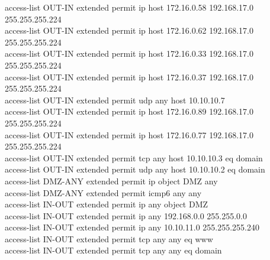 \documentclass[a4paper, 12pt]{article}
\begin{document}
{\hspace*{1cm}access-list OUT-IN extended permit ip host 172.16.0.58 192.168.17.0 255.255.255.224\\
\hspace*{1cm}access-list OUT-IN extended permit ip host 172.16.0.62 192.168.17.0 255.255.255.224\\
\hspace*{1cm}access-list OUT-IN extended permit ip host 172.16.0.33 192.168.17.0 255.255.255.224\\
\hspace*{1cm}access-list OUT-IN extended permit ip host 172.16.0.37 192.168.17.0 255.255.255.224\\
\hspace*{1cm}access-list OUT-IN extended permit udp any host 10.10.10.7\\
\hspace*{1cm}access-list OUT-IN extended permit ip host 172.16.0.89 192.168.17.0 255.255.255.224\\
\hspace*{1cm}access-list OUT-IN extended permit ip host 172.16.0.77 192.168.17.0 255.255.255.224\\
\hspace*{1cm}access-list OUT-IN extended permit tcp any host 10.10.10.3 eq domain\\
\hspace*{1cm}access-list OUT-IN extended permit udp any host 10.10.10.2 eq domain\\
\hspace*{1cm}access-list DMZ-ANY extended permit ip object DMZ any\\
\hspace*{1cm}access-list DMZ-ANY extended permit icmp6 any any\\
\hspace*{1cm}access-list IN-OUT extended permit ip any object DMZ\\
\hspace*{1cm}access-list IN-OUT extended permit ip any 192.168.0.0 255.255.0.0\\
\hspace*{1cm}access-list IN-OUT extended permit ip any 10.10.11.0 255.255.255.240\\
\hspace*{1cm}access-list IN-OUT extended permit tcp any any eq www\\
\hspace*{1cm}access-list IN-OUT extended permit tcp any any eq domain\\
}
\end{document}
